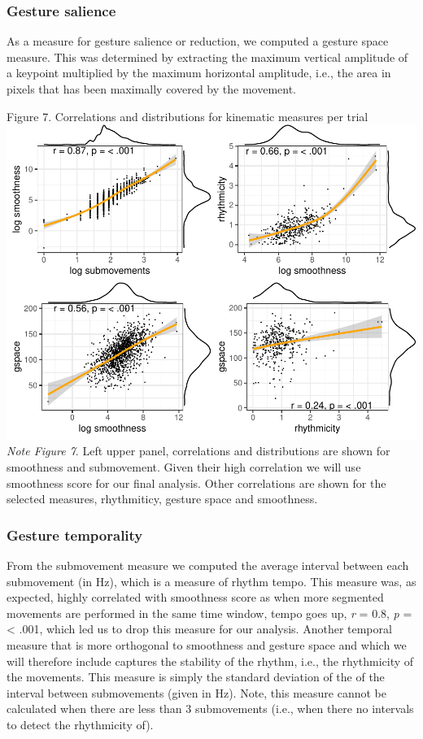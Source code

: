 \documentclass[
  man, noextraspace,floatsintext]{apa6}
\begin{document}
\hypertarget{gesture-salience}{%
\subsubsection{Gesture salience}\label{gesture-salience}}

As a measure for gesture salience or reduction, we computed a gesture space measure. This was determined by extracting the maximum vertical amplitude of a keypoint multiplied by the maximum horizontal amplitude, i.e., the area in pixels that has been maximally covered by the movement.

\pagebreak

Figure 7. Correlations and distributions for kinematic measures per trial
\includegraphics{GNet_WP_files/figure-latex/summ_kin-1.pdf}
\emph{Note Figure 7}. Left upper panel, correlations and distributions are shown for smoothness and submovement. Given their high correlation we will use smoothness score for our final analysis. Other correlations are shown for the selected measures, rhythmiticy, gesture space and smoothness.

\hypertarget{gesture-temporality}{%
\subsubsection{Gesture temporality}\label{gesture-temporality}}

From the submovement measure we computed the average interval between each submovement (in Hz), which is a measure of rhythm tempo. This measure was, as expected, highly correlated with smoothness score as when more segmented movements are performed in the same time window, tempo goes up, \emph{r} = 0.8, \emph{p} = \textless{} .001, which led us to drop this measure for our analysis. Another temporal measure that is more orthogonal to smoothness and gesture space and which we will therefore include captures the stability of the rhythm, i.e., the rhythmicity of the movements. This measure is simply the standard deviation of the of the interval between submovements (given in Hz). Note, this measure cannot be calculated when there are less than 3 submovements (i.e., when there no intervals to detect the rhythmicity of).\pagebreak
\end{document}
